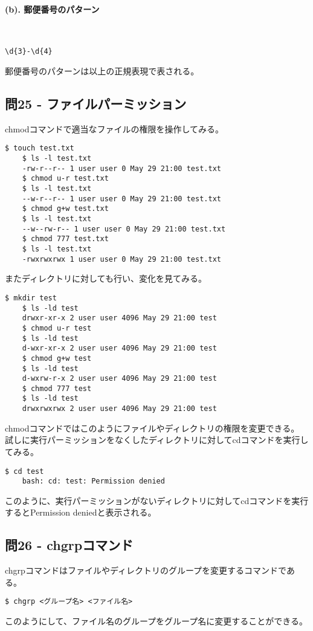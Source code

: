 \documentclass[a4paper,11pt]{jsarticle}
\begin{document}
\paragraph*{(b). 郵便番号のパターン}\quad\\
\begin{lstlisting}[caption=問24-3(b)の解答]
    \d{3}-\d{4}
\end{lstlisting}
郵便番号のパターンは以上の正規表現で表される。

\subsection*{問25 - ファイルパーミッション}
chmodコマンドで適当なファイルの権限を操作してみる。
\begin{lstlisting}[caption=問25の解答]
    $ touch test.txt
    $ ls -l test.txt
    -rw-r--r-- 1 user user 0 May 29 21:00 test.txt
    $ chmod u-r test.txt
    $ ls -l test.txt
    --w-r--r-- 1 user user 0 May 29 21:00 test.txt
    $ chmod g+w test.txt
    $ ls -l test.txt
    --w--rw-r-- 1 user user 0 May 29 21:00 test.txt
    $ chmod 777 test.txt
    $ ls -l test.txt
    -rwxrwxrwx 1 user user 0 May 29 21:00 test.txt
\end{lstlisting}
またディレクトリに対しても行い、変化を見てみる。
\begin{lstlisting}[caption=問25の解答]
    $ mkdir test
    $ ls -ld test
    drwxr-xr-x 2 user user 4096 May 29 21:00 test
    $ chmod u-r test
    $ ls -ld test
    d-wxr-xr-x 2 user user 4096 May 29 21:00 test
    $ chmod g+w test
    $ ls -ld test
    d-wxrw-r-x 2 user user 4096 May 29 21:00 test
    $ chmod 777 test
    $ ls -ld test
    drwxrwxrwx 2 user user 4096 May 29 21:00 test
\end{lstlisting}
chmodコマンドではこのようにファイルやディレクトリの権限を変更できる。
試しに実行パーミッションをなくしたディレクトリに対してcdコマンドを実行してみる。
\begin{lstlisting}[caption=問25の解答]
    $ cd test
    bash: cd: test: Permission denied
\end{lstlisting}
このように、実行パーミッションがないディレクトリに対してcdコマンドを実行するとPermission deniedと表示される。

\subsection*{問26 - chgrpコマンド}
chgrpコマンドはファイルやディレクトリのグループを変更するコマンドである。
\begin{lstlisting}[caption=問26の解答]
    $ chgrp <グループ名> <ファイル名>
\end{lstlisting}
このようにして、ファイル名のグループをグループ名に変更することができる。
\end{document}
